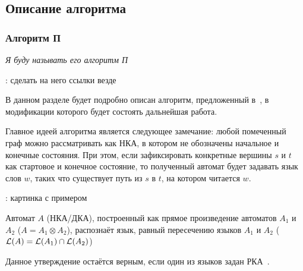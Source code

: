 \begin{definition}
\end{definition}

\begin{definition}
\end{definition}

\subsection{Описание алгоритма}

\subsubsection{Алгоритм П}

    \textit{Я буду называть его алгоритм П} 

    \TODO: сделать на него ссылки везде

    В данном разделе будет подробно описан алгоритм, предложенный в~\cite{Orachev20}, в модификации которого будет состоять дальнейшая работа.

    Главное идеей алгоритма является следующее замечание: любой помеченный граф можно рассматривать как НКА, в котором не обозначены начальное и конечные состояния. При этом, если зафиксировать конкретные вершины $s$ и $t$ как стартовое и конечное состояние, то полученный автомат будет задавать язык слов $w$, таких что существует путь из $s$ в $t$, на котором читается $w$. 

    \TODO: картинка с примером

    \begin{proposition} \cite{Hopcroft1979}

    Автомат $A$ (НКА/ДКА), построенный как прямое произведение автоматов $A_1$ и $A_2$ ($A = A_1 \otimes A_2$), распознаёт язык, равный пересечению языков $A_1$ и $A_2$ ($\mathcal{L}(A) = \mathcal{L}(A_1) \cap \mathcal{L}(A_2)$)

    \end{proposition}

    Данное утверждение остаётся верным, если один из языков задан РКА~\cite{Beigel}.


